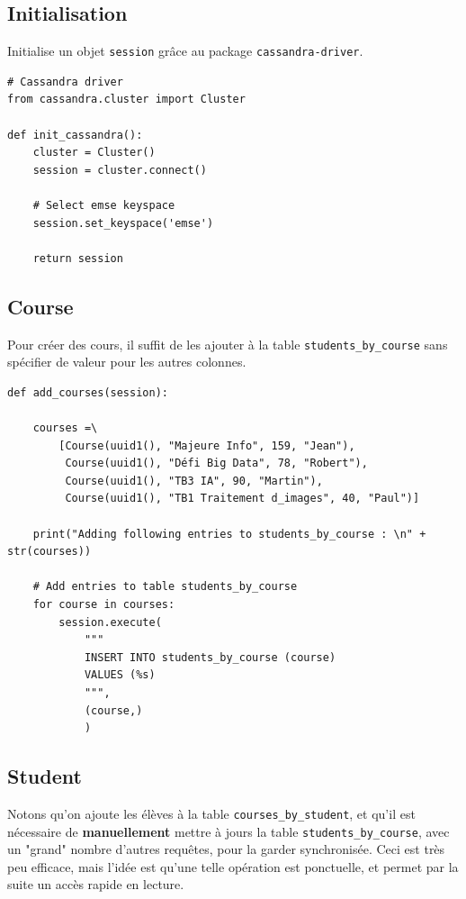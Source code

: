 \documentclass[a4paper, 11pt]{article}
\begin{document}
\subsection{Initialisation}

Initialise un objet \texttt{session} grâce au package \texttt{cassandra-driver}.

\scriptsize

\begin{tcolorbox}
\begin{verbatim}
# Cassandra driver
from cassandra.cluster import Cluster

def init_cassandra():
    cluster = Cluster()
    session = cluster.connect()

    # Select emse keyspace
    session.set_keyspace('emse')

    return session
\end{verbatim}
\end{tcolorbox}
\normalsize

\subsection{Course}
Pour créer des cours, il suffit de les ajouter à la table \texttt{students\_by\_course} sans spécifier de valeur pour les autres colonnes.

\scriptsize

\begin{tcolorbox}
\begin{verbatim}
def add_courses(session):

    courses =\
        [Course(uuid1(), "Majeure Info", 159, "Jean"),
         Course(uuid1(), "Défi Big Data", 78, "Robert"),
         Course(uuid1(), "TB3 IA", 90, "Martin"),
         Course(uuid1(), "TB1 Traitement d_images", 40, "Paul")]

    print("Adding following entries to students_by_course : \n" + str(courses))

    # Add entries to table students_by_course
    for course in courses:
        session.execute(
            """
            INSERT INTO students_by_course (course)
            VALUES (%s)
            """,
            (course,)
            )
\end{verbatim}
\end{tcolorbox}
\normalsize

\subsection{Student}
Notons qu'on ajoute les élèves à la table \texttt{courses\_by\_student}, et qu'il est nécessaire de \textbf{manuellement} mettre à jours la table \texttt{students\_by\_course}, avec un "grand" nombre d'autres requêtes, pour la garder synchronisée. Ceci est très peu efficace, mais l'idée est qu'une telle opération est ponctuelle, et permet par la suite un accès rapide en lecture.
\end{document}
